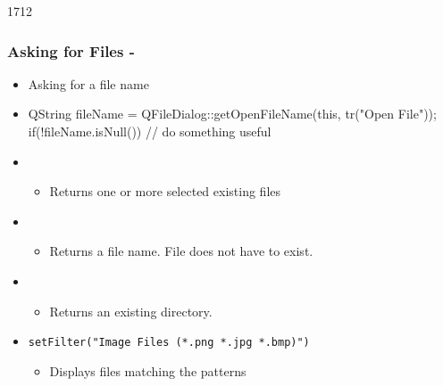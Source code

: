 \begin{slide}[fragile]{1712}
  \frametitle{Asking for Files - }
  \begin{itemize}
  \item Asking for a file name
  \item[]
    \begin{cpp}
QString fileName = 
  QFileDialog::getOpenFileName(this, tr("Open File"));      
if(!fileName.isNull()) {
  // do something useful
}
    \end{cpp}
  \item {}
    \begin{itemize}
    \item Returns one or more selected existing files
    \end{itemize}
  \item {}
    \begin{itemize}
    \item Returns a file name. File does not have to exist.
    \end{itemize}
  \item {}
    \begin{itemize}
    \item Returns an existing directory.
    \end{itemize}
  \item \texttt{setFilter("Image Files (*.png *.jpg *.bmp)")}
    \begin{itemize}
    \item Displays files matching the patterns
    \end{itemize}
  \end{itemize}
\end{slide}

